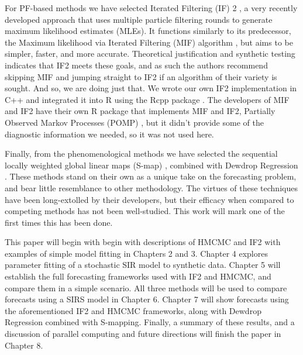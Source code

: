 For PF-based methods we have selected Iterated Filtering (IF) 2 \cite{Ionides2015}, a very recently developed approach that uses multiple particle filtering rounds to generate maximum likelihood estimates (MLEs). It functions similarly to its predecessor, the Maximum likelihood via Iterated Filtering (MIF) algorithm \cite{Ionides2006}, but aims to be simpler, faster, and more accurate. Theoretical justification and synthetic testing indicates that IF2 meets these goals, and as such the authors recommend skipping MIF and jumping straight to IF2 if an algorithm of their variety is sought. And so, we are doing just that. We wrote our own IF2 implementation in C++ and integrated it into R using the Rcpp package \cite{Eddelbuettel2011}. The developers of MIF and IF2 have their own R package that implements MIF and IF2, Partially Observed Markov Processes (POMP) \cite{King2015a}\cite{King2016}, but it didn't provide some of the diagnostic information we needed, so it was not used here.

Finally, from the phenomenological methods we have selected the sequential locally weighted global linear maps (S-map) \cite{Glaser2014}\cite{Hsieh2008}\cite{Sugihara1990}\cite{Sugihara1994}, combined with Dewdrop Regression \cite{Glaser2014}. These methods stand on their own as a unique take on the forecasting problem, and bear little resemblance to other methodology. The virtues of these techniques have been long-extolled by their developers, but their efficacy when compared to competing methods has not been well-studied. This work will mark one of the first times this has been done.

This paper will begin with begin with descriptions of HMCMC and IF2 with examples of simple model fitting in Chapters 2 and 3. Chapter 4 explores parameter fitting of a stochastic SIR model to synthetic data. Chapter 5 will establish the full forecasting frameworks used with IF2 and HMCMC, and compare them in a simple scenario. All three methods will be used to compare forecasts using a SIRS model in Chapter 6. Chapter 7 will show forecasts using the aforementioned IF2 and HMCMC frameworks, along with Dewdrop Regression combined with S-mapping. Finally, a summary of these results, and a discussion of parallel computing and future directions will finish the paper in Chapter 8.